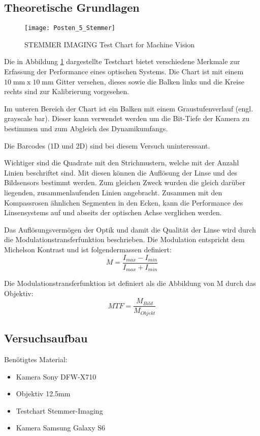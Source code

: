 \subsection{Theoretische Grundlagen}
\begin{figure}[h!]
  \centering
  \texttt{[image: Posten\_5\_Stemmer]}
  \caption{STEMMER IMAGING Test Chart for Machine Vision \cite{ref:stemmer}}
  \label{fig:p5stemmer}
\end{figure}

Die in Abbildung \ref{fig:p5stemmer} dargestellte Testchart bietet verschiedene Merkmale zur Erfassung
der Performance eines optischen Systems.
Die Chart ist mit einem $10\;\text{mm}\; \mathrm{x}\; 10\;\text{mm}$ Gitter versehen, dieses sowie die Balken links und die Kreise rechts sind zur Kalibrierung vorgesehen.

Im unteren Bereich der Chart ist ein Balken mit einem Graustufenverlauf (engl. grayscale bar).
Dieser kann verwendet werden um die Bit-Tiefe der Kamera zu bestimmen und zum Abgleich des Dynamikumfangs.

Die Barcodes (1D und 2D) sind bei diesem Versuch uninteressant.

Wichtiger sind die Quadrate mit den Strichmustern, welche mit der Anzahl Linien beschriftet sind.
Mit diesen können die Auflösung der Linse und des Bildsensors bestimmt werden.
Zum gleichen Zweck wurden die gleich darüber liegenden, zusammenlaufenden Linien angebracht.
Zusammen mit den Kompassrosen ähnlichen Segmenten in den Ecken,
kann die Performance des Linsensystems auf und abseits der optischen Achse verglichen werden.

Das Auflösungsvermögen der Optik und damit die Qualität der Linse wird durch die Modulationstransferfunktion beschrieben. Die Modulation entspricht dem Michelson Kontrast und ist folgendermassen definiert:
\begin{equation}
  M=\frac{I_{max}-I_{min}}{I_{max}+I_{min}}
\end{equation}

Die Modulationstransferfunktion ist definiert als die Abbildung von M durch das Objektiv:
\begin{equation}
  MTF=\frac{M_{Bild}}{M_{Objekt}}
\end{equation}

\newpage
\subsection{Versuchsaufbau}
Benötigtes Material:
\begin{itemize}
\item Kamera Sony DFW-X710
\item Objektiv 12.5mm
\item Testchart Stemmer-Imaging
\item Kamera Samsung Galaxy S6
\end{itemize}



